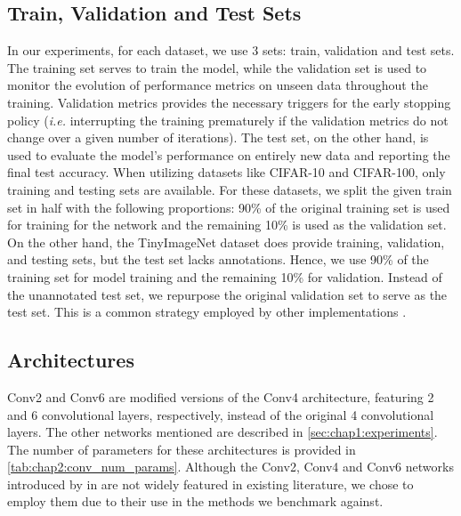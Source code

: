 \subsection{Train, Validation and Test Sets}

In our experiments, for each dataset, we use 3 sets: train, validation and test
sets. The training set serves to train the model, while the validation set is
used to monitor the evolution of performance metrics on unseen data throughout
the training. Validation metrics provides the necessary triggers for the early
stopping policy (\emph{i.e.} interrupting the training prematurely if the
validation metrics do not change over a given number of iterations). The test
set, on the other hand, is used to evaluate the model's performance on entirely
new data and reporting the final test accuracy. When utilizing datasets like
CIFAR-10 and CIFAR-100, only training and testing sets are available. For these
datasets, we split the given train set in half with the following proportions:
90\% of the original training set is used for training for the network and the
remaining 10\% is used as the validation set. On the other hand, the
TinyImageNet dataset does provide training, validation, and testing sets, but
the test set lacks annotations. Hence, we use 90\% of the training set for model
training and the remaining 10\% for validation. Instead of the unannotated test
set, we repurpose the original validation set to serve as the test set. This is
a common strategy employed by other implementations
\cite{hanyuanxu2018tinyimagenet,nbdt,alvinwan2020nbdt}.\\

\subsection{Architectures}\label{sec:intro:architectures}

Conv2 and Conv6 are modified versions of the Conv4 architecture, featuring 2 and
6 convolutional layers, respectively, instead of the original 4 convolutional
layers. The other networks mentioned are described in
\cref{sec:chap1:experiments}. The number of parameters for these architectures
is provided in \cref{tab:chap2:conv_num_params}. Although the Conv2, Conv4 and
Conv6 networks introduced by \citeauthor{DBLP:conf/iclr/FrankleC19} in
\cite{DBLP:conf/iclr/FrankleC19} are not widely featured in existing literature,
we chose to employ them due to their use in the methods we benchmark against.

